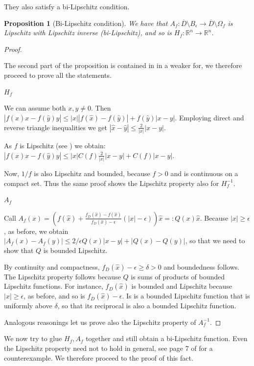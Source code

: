 \documentclass[english,a4paper,12pt,oneside]{scrbook}
\theoremstyle{break}
\newtheorem{prop}[equation]{Proposition}
\newenvironment{mproof}[1][\proofname]{%
  \begin{proof}[#1]$ $\par\nobreak\ignorespaces
}{%
  \end{proof}
}
\renewcommand*{\proofname}{Proof}
\theoremstyle{remark}
\newcommand{\mR}{\mathbb{R}}
\newcommand{\xh}{\hat{x}}
\newcommand{\yh}{\hat{y}}
\newcommand{\eps}{\epsilon}
\begin{document}
They also satisfy a bi-Lipschitz condition.

\begin{prop}[Bi-Lipschitz condition]
We have that $A_f:  \overline{D}\setminus B_\eps\rightarrow \overline{D}\setminus \Omega_f $ is Lipschitz with Lipschitz inverse (bi-Lipschitz), and so is $H_f: \mR^n \rightarrow \mR^n$.
\end{prop}

\begin{mproof}

The second part of the proposition is contained in \cite{deckelnick} in a weaker for, we therefore proceed to prove all the statements.

\underline{$H_f$}

We can assume both $x,y\neq 0$. Then $|f(\xh)x-f(\yh)y|\leq |x||f(\xh)-f(\yh)|+f(\yh)|x-y|$. Employing direct and reverse triangle inequalities we get $|\xh-\yh|\leq \frac{2}{|x|}|x-y|$.

As $f$ is Lipschitz (see \cite{deckelnick}) we obtain:  $|f(\xh)x-f(\yh)y|\leq |x|C(f)\frac{2}{|x|}|x-y|+C(f)|x-y|$.

Now, $1/f$ is also Lipschitz and bounded, because $f>0$ and is continuous on a compact set. Thus the same proof shows the Lipschitz property also for $H_f^{-1}$.

\underline{$A_f$}

Call $A_f(x)=\left (  f(\xh)+\frac{f_D(\xh)-f(\xh)}{f_D(\xh)-\eps}(|x|-\eps) \right )\xh =:Q(x)\xh $. Because $|x|\geq\eps$, as before, we obtain $|A_f(x)-A_f(y)|\leq 2/\eps Q(x) |x-y|+|Q(x)-Q(y)|$, so that we need to show that $Q$ is bounded Lipschitz.

By continuity and compactness, $f_D(\xh)-\eps\geq \delta >0$ and boundedness follows. The Lipschitz property follows because $Q$ is sums of products of bounded Lipschitz functions. For instance, $f_D(\xh)$ is bounded and Lipschitz because $|x|\geq\eps$, as before, and so is $f_D(\xh)-\eps$. Is is a bounded Lipschitz function that is uniformly above $\delta$, so that its reciprocal is also a bounded Lipschitz function.

Analogous reasonings let us prove also the Lipschitz property of $A_f^{-1}$.

\end{mproof}

We now try to glue $H_f, A_f$ together and still obtain a bi-Lipschitz function. Even the Lipschitz property need not to hold in general, see page 7 of \cite{weaver} for a counterexample. We therefore proceed to the proof of this fact.
\end{document}
